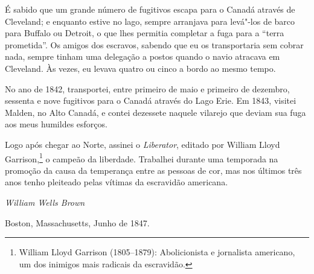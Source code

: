 É sabido que um grande número de fugitivos escapa para o Canadá através
de Cleveland; e enquanto estive no lago, sempre arranjava para levá"-los
de barco para Buffalo ou Detroit, o que lhes permitia completar a fuga
para a ``terra prometida''. Os amigos dos escravos, sabendo que eu os
transportaria sem cobrar nada, sempre tinham uma delegação a postos
quando o navio atracava em Cleveland. Às vezes, eu levava quatro ou
cinco a bordo ao mesmo tempo.

No ano de 1842, transportei, entre primeiro de maio e primeiro de
dezembro, sessenta e nove fugitivos para o Canadá através do Lago Erie.
Em 1843, visitei Malden, no Alto Canadá, e contei dezessete naquele
vilarejo que deviam sua fuga aos meus humildes esforços.

Logo após chegar ao Norte, assinei o \emph{Liberator}, editado por
William Lloyd Garrison,\footnote{William Lloyd Garrison (1805--1879):
  Abolicionista e jornalista americano, um dos inimigos mais radicais da
  escravidão.} o campeão da liberdade. Trabalhei durante uma temporada
na promoção da causa da temperança entre as pessoas de cor, mas nos
últimos três anos tenho pleiteado pelas vítimas da escravidão americana.

\begin{flushright}
\emph{William Wells Brown}

Boston, Massachusetts, Junho de 1847.
\end{flushright}


